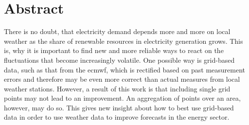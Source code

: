 
\chapter*{Abstract}

\begin{center}
  \begin{minipage}{12cm}
    \begin{sloppypar}
    	There is no doubt, that electricity demand depends more and more on local weather as the share of renewable resources in electricity generation grows. This is, why it is important to find new and more reliable ways to react on the fluctuations that become increasingly volatile. One possible way is grid-based data, such as that from the \gls{ecmwf}, which is rectified based on past measurement errors and therefore may be even more correct than actual measures from local weather stations. However, a result of this work is that including single grid points may not lead to an improvement. An aggregation of points over an area, however, may do so. This gives new insight about how to best use grid-based data in order to use weather data to improve forecasts in the energy sector.
    \end{sloppypar}
  \end{minipage}
\end{center}